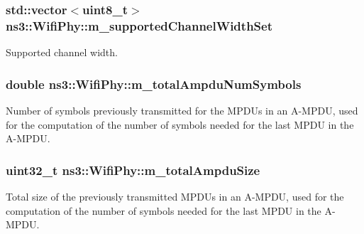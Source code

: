 \subsubsection[{\texorpdfstring{m\+\_\+supported\+Channel\+Width\+Set}{m_supportedChannelWidthSet}}]{\setlength{\rightskip}{0pt plus 5cm}std\+::vector$<$uint8\+\_\+t$>$ ns3\+::\+Wifi\+Phy\+::m\+\_\+supported\+Channel\+Width\+Set\hspace{0.3cm}{\ttfamily [private]}}\hypertarget{classns3_1_1WifiPhy_ad3e92b538b136420723c2743261bb987}{}\label{classns3_1_1WifiPhy_ad3e92b538b136420723c2743261bb987}


Supported channel width. 

\subsubsection[{\texorpdfstring{m\+\_\+total\+Ampdu\+Num\+Symbols}{m_totalAmpduNumSymbols}}]{\setlength{\rightskip}{0pt plus 5cm}double ns3\+::\+Wifi\+Phy\+::m\+\_\+total\+Ampdu\+Num\+Symbols\hspace{0.3cm}{\ttfamily [private]}}\hypertarget{classns3_1_1WifiPhy_aef81821222be314fe60d1b1827b1397f}{}\label{classns3_1_1WifiPhy_aef81821222be314fe60d1b1827b1397f}


Number of symbols previously transmitted for the M\+P\+D\+Us in an A-\/\+M\+P\+DU, used for the computation of the number of symbols needed for the last M\+P\+DU in the A-\/\+M\+P\+DU. 

\subsubsection[{\texorpdfstring{m\+\_\+total\+Ampdu\+Size}{m_totalAmpduSize}}]{\setlength{\rightskip}{0pt plus 5cm}uint32\+\_\+t ns3\+::\+Wifi\+Phy\+::m\+\_\+total\+Ampdu\+Size\hspace{0.3cm}{\ttfamily [private]}}\hypertarget{classns3_1_1WifiPhy_a33881bc9adbd2f0fa397fa6d5a44365f}{}\label{classns3_1_1WifiPhy_a33881bc9adbd2f0fa397fa6d5a44365f}


Total size of the previously transmitted M\+P\+D\+Us in an A-\/\+M\+P\+DU, used for the computation of the number of symbols needed for the last M\+P\+DU in the A-\/\+M\+P\+DU. 

